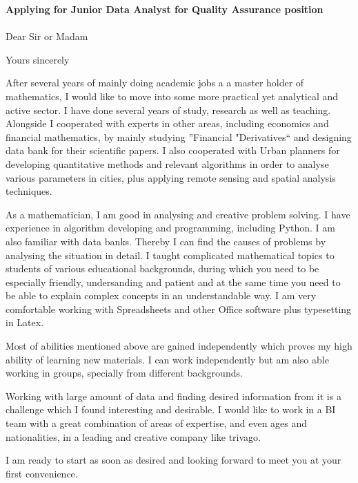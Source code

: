 \documentclass[11pt,a4paper,sans]{moderncv}        %
\title{}                               %
\begin{document}
\date{March 12, 2015}
\opening{\textbf{Applying for Junior Data Analyst for Quality Assurance position }\\ \  \\ Dear Sir or Madam}
\closing{Yours sincerely }
\enclosure[Enclosure]{}          %
\makelettertitle

After several years of mainly doing academic jobs a a  master holder of mathematics, I would like to move into some more practical yet analytical and active sector. I have done several years of study, research as well as teaching. Alongside I cooperated with experts in other areas, including economics  and financial mathematics, by mainly studying ''Financial "Derivatives`` and designing data bank for their scientific papers. I also cooperated with Urban planners for developing quantitative methods and relevant algorithms in order to analyse various parameters in cities, plus applying remote sensing and spatial analysis techniques.

As a mathematician, I am good in analysing and creative problem solving. I have experience in algorithm developing and programming, including Python. I am  also familiar with data banks. Thereby I can find the causes of problems by analysing the situation in detail.
I taught complicated mathematical topics to students of various educational backgrounds, during which you need to be especially friendly, undersanding and patient and at the same time you need to be able to explain complex concepts in an understandable way.  
I am very comfortable working with Spreadsheets and other Office software plus typesetting in Latex. 

Most of abilities mentioned above are gained independently which proves my high ability of learning new materials. I can work independently but am also able working in groups, specially from different backgrounds.

Working with large amount of data and finding desired information from it is a challenge which I found interesting and desirable. I would like to work in a BI team with a great combination of areas of expertise, and even ages and nationalities, in a leading and creative company like trivago.

I am ready to start as soon as desired and  looking forward to meet you at your first convenience.
 \vspace{3mm}
 
\makeletterclosing
\end{document}
